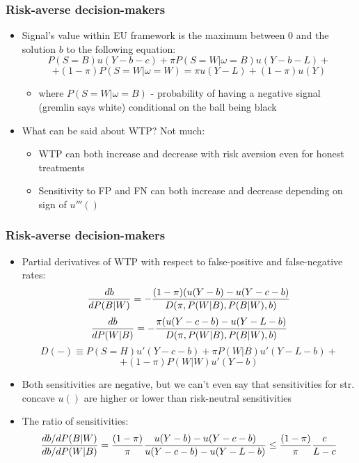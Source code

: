 \documentclass[11pt,hyperref={bookmarks=false}]{beamer}
\begin{document}
\begin{frame}
\frametitle{Risk-averse decision-makers}
\begin{itemize}
\item Signal's value within EU framework is the maximum between 0 and the solution $b$ to the following equation:
$$P(S=B)u(Y-b-c)+\pi P(S=W|\omega=B)u(Y-b-L)+$$
$$+(1-\pi)P(S=W|\omega=W)=\pi u(Y-L)+(1-\pi) u(Y)$$
\begin{itemize}
\item where $P(S=W|\omega=B)$ - probability of having a negative signal (gremlin says white) conditional on the ball being black
\end{itemize}
\item What can be said about WTP? Not much:
\begin{itemize}
\item WTP can both increase and decrease with risk aversion even for honest treatments
\item Sensitivity to FP and FN can both increase and decrease depending on sign of $u'''()$
\end{itemize}
\end{itemize}
\end{frame}

\begin{frame}
\frametitle{Risk-averse decision-makers}

\begin{itemize}
\item Partial derivatives of WTP with respect to false-positive and false-negative rates:
\small
$${db\over dP(B|W)}=-{(1-\pi)(u(Y-b)-u(Y-c-b)\over D(\pi, P(W|B), P(B|W), b)}$$
$${db\over dP(W|B)}=-{\pi(u(Y-c-b)-u(Y-L-b)\over D(\pi, P(W|B), P(B|W), b)}$$
$$D(-)\equiv P(S=H)u'(Y-c-b)+\pi P(W|B)u'(Y-L-b)+$$
$$+(1-\pi)P(W|W)u'(Y-b)$$
\normalsize
\item Both sensitivities are negative, but we can't even say that sensitivities for str. concave $u()$ are higher or lower than risk-neutral sensitivities
\item The ratio of sensitivities: 
\small
$${db/dP(B|W)\over db/dP(W|B)}={(1-\pi)\over \pi} {u(Y-b)-u(Y-c-b)\over u(Y-c-b)-u(Y-L-b)}\leq {(1-\pi)\over \pi} {c\over L-c}$$
\end{itemize}
\end{frame}
\end{document}
